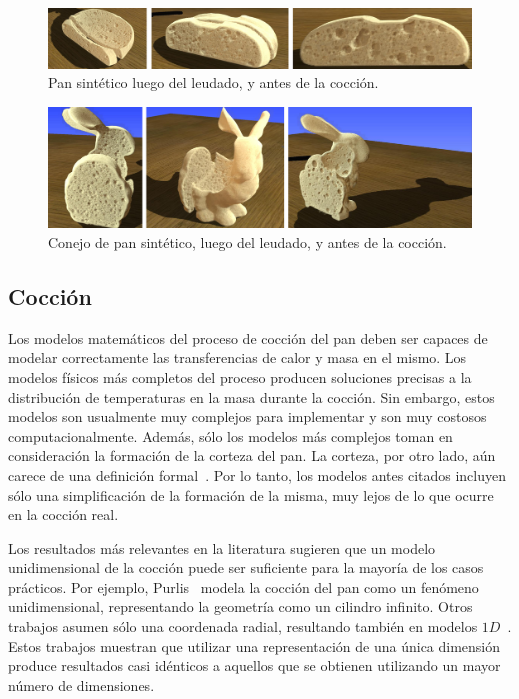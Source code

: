 \begin{figure}
\includegraphics[width=13cm]{figures/prebakebread}
\caption{Pan sintético luego del leudado, y antes de la cocción.}
\label{fg:proving}
\end{figure}

\begin{figure}
\includegraphics[width=13cm]{figures/prebakebunny}
\caption{Conejo de pan sintético, luego del leudado, y antes de la cocción.}
\label{fg:provingBunny}
\end{figure}

\subsection{Cocción}
Los modelos matemáticos del proceso de cocción del pan deben ser capaces de modelar correctamente las transferencias de calor y masa en el mismo.
Los modelos físicos más completos del proceso producen soluciones precisas a la distribución de temperaturas en la masa durante la cocción.
Sin embargo, estos modelos son usualmente muy complejos para implementar y son muy costosos computacionalmente.
Además, sólo los modelos más complejos toman en consideración la formación de la corteza del pan.
La corteza, por otro lado, aún carece de una definición formal~\cite{Vanin2009}.
Por lo tanto, los modelos antes citados incluyen sólo una simplificación de la formación de la misma, muy lejos de lo que ocurre en la cocción real.

Los resultados más relevantes en la literatura sugieren que un modelo unidimensional de la cocción puede ser suficiente para la mayoría de los casos prácticos.
Por ejemplo, Purlis~\cite{Purlis2011} modela la cocción del pan como un fenómeno unidimensional, representando la geometría como un cilindro infinito.
Otros trabajos asumen sólo una coordenada radial, resultando también en modelos $1D$~\cite{Powathil2004, Thorvaldsson1999}.
Estos trabajos muestran que utilizar una representación de una única dimensión produce resultados casi idénticos a aquellos que se obtienen utilizando un mayor número de dimensiones.

